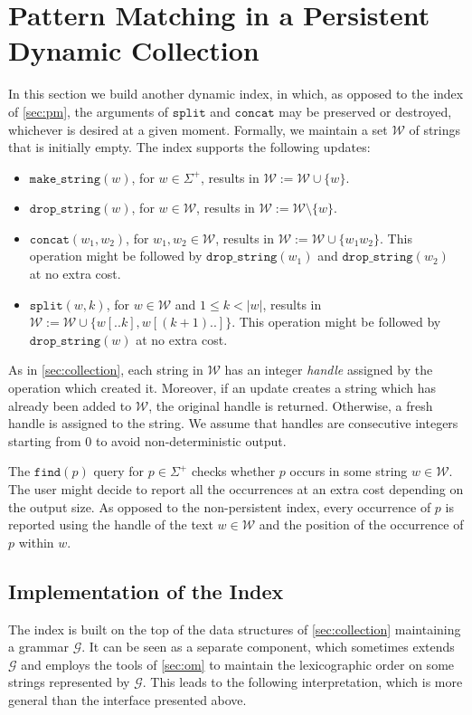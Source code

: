 \documentclass[a4paper]{article}
\theoremstyle{remark}
\newcommand{\makeop}{\mathtt{make\_string}}
\newcommand{\dropop}{\mathtt{drop\_string}}
\newcommand{\concop}{\mathtt{concat}}
\newcommand{\splitop}{\mathtt{split}}
\newcommand{\findop}{\mathtt{find}}
\newcommand{\str}{w}
\newcommand{\grammar}{\mathcal{G}}
\newcommand{\coll}{\mathcal{W}}
\begin{document}
\section{Pattern Matching in a Persistent Dynamic Collection}\label{sec:ppm}
In this section we build another dynamic index, in which, as opposed to the index of \cref{sec:pm},
the arguments of $\splitop$ and $\concop$ may be preserved or destroyed, whichever is desired at a given moment.
Formally, we maintain a set $\coll$ of strings that is initially empty.
The index supports the following updates:
\begin{itemize}
  \item $\makeop(\str)$, for $\str\in \Sigma^+$, results in $\coll:=\coll\cup \{\str\}$.
      \item $\dropop(\str)$, for $\str\in \coll$, results in $\coll:=\coll\setminus \{\str\}$.
   \item $\concop(\str_1,\str_2)$, for $\str_1,\str_2\in \coll$, results in $\coll:=\coll\cup \{\str_1\str_2\}$.
   This operation might be followed by $\dropop(w_1)$ and $\dropop(w_2)$ at no extra cost.
  \item $\splitop(\str,k)$, for $\str\in \coll$ and $1\leq k<|\str|$, results in
    $\coll:=\coll\cup \{\str[..k], \str[(k + 1)..]\}$.
       This operation might be followed by $\dropop(w)$ at no extra cost.
\end{itemize}

As in \cref{sec:collection}, each string in $\coll$ has an integer \emph{handle} assigned by the operation which created it.
Moreover, if an update creates a string which has already been added to $\coll$, the original handle is returned.
Otherwise, a fresh handle is assigned to the string. We assume that handles are consecutive integers starting from $0$
to avoid non-deterministic output.

The $\findop(p)$ query for $p\in \Sigma^+$ checks whether $p$ occurs in some string $w\in \coll$.
The user might decide to report all the occurrences at an extra cost depending on the output size.
As opposed to the non-persistent index, every occurrence of $p$ is reported using the handle of the text $w\in \coll$ and the position of the occurrence of $p$ within $w$.


\subsection{Implementation of the Index}\label{sec:internal_index}
The index is built on the top of the data structures of \cref{sec:collection} maintaining a grammar $\grammar$.
It can be seen as a separate component, which sometimes extends $\grammar$ and employs the tools of \cref{sec:om}
to maintain the lexicographic order on some strings represented by $\grammar$.
This leads to the following interpretation, which is more general than the interface presented above.
\end{document}
